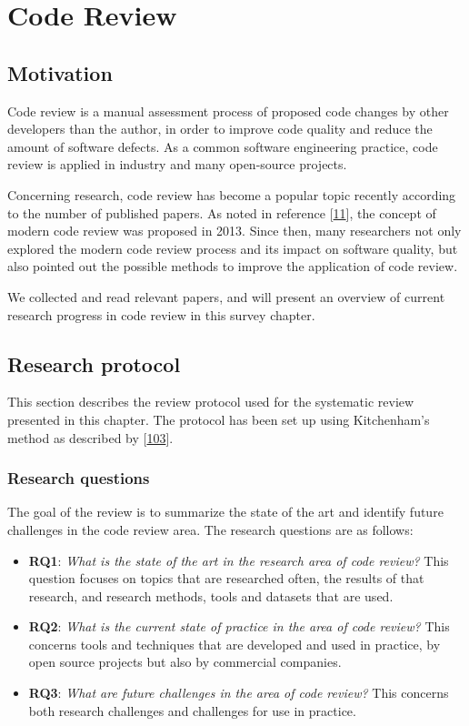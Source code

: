 \documentclass[]{book}
\providecommand{\tightlist}{%
  \setlength{\itemsep}{0pt}\setlength{\parskip}{0pt}}
\begin{document}
\chapter{Code Review}\label{code-review}

\section{Motivation}\label{motivation-5}

Code review is a manual assessment process of proposed code changes by
other developers than the author, in order to improve code quality and
reduce the amount of software defects. As a common software engineering
practice, code review is applied in industry and many open-source
projects.

Concerning research, code review has become a popular topic recently
according to the number of published papers. As noted in reference
{[}\protect\hyperlink{ref-bacchelli2013expectations}{11}{]}, the concept
of modern code review was proposed in 2013. Since then, many researchers
not only explored the modern code review process and its impact on
software quality, but also pointed out the possible methods to improve
the application of code review.

We collected and read relevant papers, and will present an overview of
current research progress in code review in this survey chapter.

\section{Research protocol}\label{research-protocol-4}

This section describes the review protocol used for the systematic
review presented in this chapter. The protocol has been set up using
Kitchenham's method as described by
{[}\protect\hyperlink{ref-kitchenham2007}{103}{]}.

\subsection{Research questions}\label{research-questions-2}

The goal of the review is to summarize the state of the art and identify
future challenges in the code review area. The research questions are as
follows:

\begin{itemize}
\tightlist
\item
  \textbf{RQ1}: \emph{What is the state of the art in the research area
  of code review?} This question focuses on topics that are researched
  often, the results of that research, and research methods, tools and
  datasets that are used.
\item
  \textbf{RQ2}: \emph{What is the current state of practice in the area
  of code review?} This concerns tools and techniques that are developed
  and used in practice, by open source projects but also by commercial
  companies.
\item
  \textbf{RQ3}: \emph{What are future challenges in the area of code
  review?} This concerns both research challenges and challenges for use
  in practice.
\end{itemize}
\end{document}
